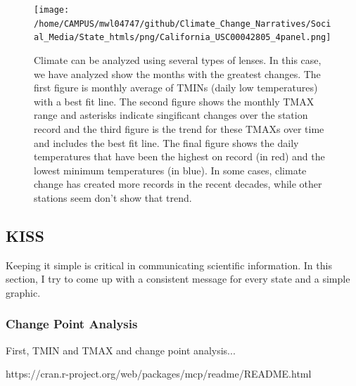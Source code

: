 \documentclass{article}
\begin{document}
\begin{knitrout}
\begin{kframe}
{\ttfamily\noindent\bfseries\color{errorcolor}{\#\# Error in axis(2, at = ytics, labels = ylabs): object 'ytics' not found}}

{\ttfamily\noindent\bfseries\color{errorcolor}{\#\# Error in axis(1, at = xtics, labels = xlabs): object 'xtics' not found}}

{\ttfamily\noindent\bfseries\color{errorcolor}{\#\# Error in barplot(height = R1\$TMAX, space = 0, add = TRUE, axes = FALSE, : object 'R1' not found}}

{\ttfamily\noindent\bfseries\color{errorcolor}{\#\# Error in barplot(height = R1\$TMIN, space = 0, add = TRUE, axes = FALSE, : object 'R1' not found}}\end{kframe}
\end{knitrout}

\begin{figure}
\texttt{[image: /home/CAMPUS/mwl04747/github/Climate\_Change\_Narratives/Social\_Media/State\_htmls/png/California\_USC00042805\_4panel.png]}
\caption{Climate can be analyzed using several types of lenses. In this case, we have analyzed show the months with the greatest changes. The first figure is monthly average of TMINs (daily low temperatures) with a best fit line. The second figure shows the monthly TMAX range and asterisks indicate singificant changes over the station record and the third figure is the trend for these TMAXs over time and includes the best fit line. The final figure shows the daily temperatures that have been the highest on record (in red) and the lowest minimum temperatures (in blue). In some cases, climate change has created more records in the recent decades, while other stations seem don't show that trend.}
\label{fig:4panel}
\end{figure}

\subsection{KISS}

Keeping it simple is critical in communicating scientific information. In this section, I try to come up with a consistent message for every state and a simple graphic. 

\subsubsection{Change Point Analysis}
First, TMIN and TMAX and change point analysis...

https://cran.r-project.org/web/packages/mcp/readme/README.html
\end{document}
